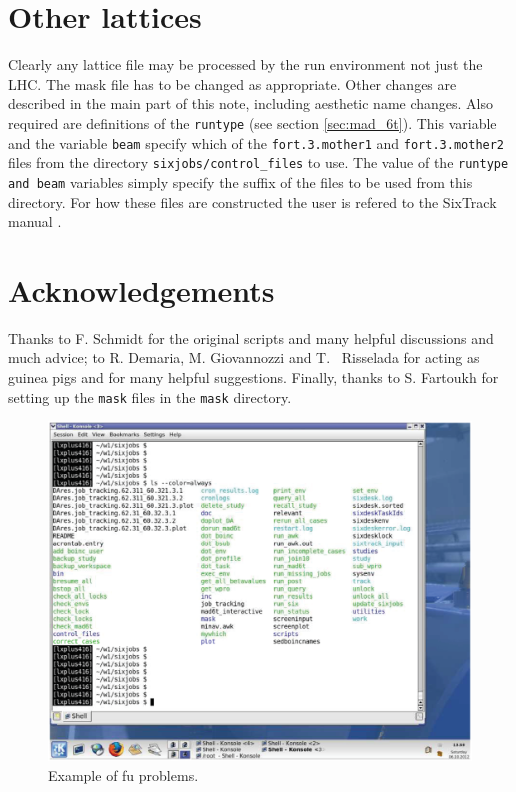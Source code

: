 \documentclass{cernatsnote}    %
\begin{document}
\section{Other lattices}
\label{sec:otherlattices}

Clearly any lattice file may be processed by the run environment not
just the LHC. The mask file has to be changed as appropriate.
Other changes are described in the main part of this
note, including aesthetic name changes. Also required are definitions
of the {\tt runtype} (see section \ref{sec:mad_6t}). This variable
and the variable {\tt beam} specify which of the {\tt fort.3.mother1} and {\tt fort.3.mother2}
files from the directory {\tt sixjobs/control\_files}
to use. The value of the {\tt runtype and beam} variables simply specify the suffix
of the files to be used from this directory. For how these files are
constructed the user is refered to the SixTrack manual \cite{SixTrack}.
\section{Acknowledgements}
Thanks to F. Schmidt for the original scripts and many helpful discussions
and much advice; to R. Demaria, M. Giovannozzi and T. ~Risselada
for acting as guinea pigs and for many helpful suggestions.
Finally, thanks to S. Fartoukh for setting up the {\tt mask} files in
the {\tt mask} directory.

\begin{figure}[tb]
\centering
\includegraphics*[width=200mm]{print.eps}
\caption{Example of fu problems.}
\label{dir}
\end{figure}
\end{document}
